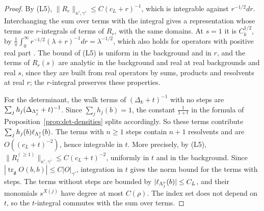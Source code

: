 \begin{proof}
By (L5), $\|R_r\|_{\kappa',\gamma'}\le C(c_L+r)^{-1}$, which is integrable against $r^{-1/2}dr$. Interchanging the sum over terms with the integral gives a representation whose terms are $r$-integrals of terms of $R_r$, with the same domains. At $s=1$ it is $C_k^{1/2}$, by $\frac1\pi\int_0^\infty r^{-1/2}(\lambda+r)^{-1}dr=\lambda^{-1/2}$, which also holds for operators with positive real part \cite[(192)--(193)]{DimockI}. The bound of (L5) is uniform in the background and in $r$, and the terms of $R_r(s)$ are analytic in the background and real at real backgrounds and real $s$, since they are built from real operators by sums, products and resolvents at real $r$; the $r$-integral preserves these properties.

For the determinant, the walk terms of $(\Delta_k+t)^{-1}$ with no steps are $\sum_jh_j(\Delta_{\Lambda^v_j}+t)^{-1}$. Since $\sum_jh_j(b)=1$, the constant $\frac1{1+t}$ in the formula of Proposition~\ref{prop:det-densities} splits accordingly. So these terms contribute $\sum_jh_j(b)\ell_{\Lambda^v_j}(b)$. The terms with $n\ge1$ steps contain $n+1$ resolvents and are $O((c_L+t)^{-2})$, hence integrable in $t$. More precisely, by (L5), $\|R^{(\ge1)}_t\|_{\kappa',\gamma'}\le C(c_L+t)^{-2}$, uniformly in $t$ and in the background. Since $|\operatorname{tr}_{\mathfrak g}O(b,b)|\le C|O|_{\gamma'}$, integration in $t$ gives the norm bound for the terms with steps. The terms without steps are bounded by $|\ell_{\Lambda^v_j}(b)|\le C_L$, and their monomials $s^{X(j)}$ have degree at most $C(\rho)$. The index set does not depend on $t$, so the $t$-integral commutes with the sum over terms.
\end{proof}

